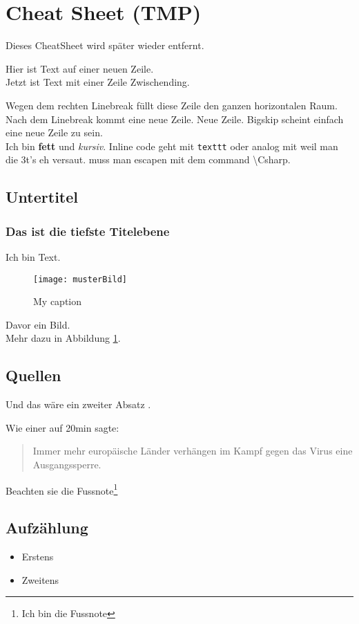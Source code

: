 \section{Cheat Sheet (TMP)}
Dieses CheatSheet wird später wieder entfernt.

Hier ist Text auf einer neuen Zeile. \\

Jetzt ist Text mit einer Zeile Zwischending.

Wegen dem rechten Linebreak füllt diese Zeile den ganzen horizontalen Raum. Nach dem Linebreak \linebreak  kommt eine neue Zeile.
Neue Zeile. \bigskip
Bigskip scheint einfach eine neue Zeile zu sein.\\

Ich bin \textbf{fett} und \textit{kursiv}. Inline code geht mit \texttt{texttt} oder analog mit  weil man die 3t's eh versaut. \Csharp muss man escapen mit dem command \textbackslash Csharp.

\subsection{Untertitel}
\subsubsection{Das ist die tiefste Titelebene}
Ich bin Text.
\begin{figure}[H]
    \centering
    \texttt{[image: musterBild]}
    \caption{My caption}
    \label{fig:bsp}
\end{figure}
Davor ein Bild. \\
Mehr dazu in Abbildung \ref{fig:bsp}.

\subsection{Quellen}
Und das wäre ein zweiter Absatz \cite{ba}.

Wie einer auf 20min sagte:\cite{dev}
\begin{quote}
Immer mehr europäische Länder verhängen im Kampf gegen das Virus eine Ausgangssperre.
\end{quote}

Beachten sie die Fussnote\footnote{Ich bin die Fussnote}

\subsection{Aufzählung}
\begin{itemize}
    \item Erstens
    \item Zweitens
\end{itemize}

